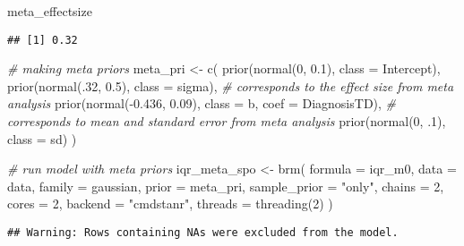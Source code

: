 \documentclass[
]{article}
\newenvironment{Shaded}{\begin{snugshade}}{\end{snugshade}}
\newcommand{\AttributeTok}[1]{\textcolor[rgb]{0.77,0.63,0.00}{#1}}
\newcommand{\CommentTok}[1]{\textcolor[rgb]{0.56,0.35,0.01}{\textit{#1}}}
\newcommand{\DecValTok}[1]{\textcolor[rgb]{0.00,0.00,0.81}{#1}}
\newcommand{\FloatTok}[1]{\textcolor[rgb]{0.00,0.00,0.81}{#1}}
\newcommand{\FunctionTok}[1]{\textcolor[rgb]{0.00,0.00,0.00}{#1}}
\newcommand{\NormalTok}[1]{#1}
\newcommand{\OtherTok}[1]{\textcolor[rgb]{0.56,0.35,0.01}{#1}}
\newcommand{\SpecialCharTok}[1]{\textcolor[rgb]{0.00,0.00,0.00}{#1}}
\newcommand{\StringTok}[1]{\textcolor[rgb]{0.31,0.60,0.02}{#1}}
\begin{document}
\begin{Shaded}
\begin{Highlighting}[]
\NormalTok{meta\_effectsize}
\end{Highlighting}
\end{Shaded}

\begin{verbatim}
## [1] 0.32
\end{verbatim}

\begin{Shaded}
\begin{Highlighting}[]
\CommentTok{\# making meta priors}
\NormalTok{meta\_pri }\OtherTok{\textless{}{-}} \FunctionTok{c}\NormalTok{(}
  \FunctionTok{prior}\NormalTok{(}\FunctionTok{normal}\NormalTok{(}\DecValTok{0}\NormalTok{, }\FloatTok{0.1}\NormalTok{), }\AttributeTok{class =}\NormalTok{ Intercept),}
  \FunctionTok{prior}\NormalTok{(}\FunctionTok{normal}\NormalTok{(.}\DecValTok{32}\NormalTok{, }\FloatTok{0.5}\NormalTok{), }\AttributeTok{class =}\NormalTok{ sigma), }\CommentTok{\# corresponds to the effect size from meta analysis}
  \FunctionTok{prior}\NormalTok{(}\FunctionTok{normal}\NormalTok{(}\SpecialCharTok{{-}}\FloatTok{0.436}\NormalTok{, }\FloatTok{0.09}\NormalTok{), }\AttributeTok{class =}\NormalTok{ b, }\AttributeTok{coef =}\NormalTok{ DiagnosisTD), }\CommentTok{\# corresponds to mean and standard error from meta analysis}
  \FunctionTok{prior}\NormalTok{(}\FunctionTok{normal}\NormalTok{(}\DecValTok{0}\NormalTok{, .}\DecValTok{1}\NormalTok{), }\AttributeTok{class =}\NormalTok{ sd)}
\NormalTok{)}

\CommentTok{\# run model with meta priors}
\NormalTok{iqr\_meta\_spo }\OtherTok{\textless{}{-}} \FunctionTok{brm}\NormalTok{(}
  \AttributeTok{formula =}\NormalTok{ iqr\_m0,}
  \AttributeTok{data =}\NormalTok{ data,}
  \AttributeTok{family =}\NormalTok{ gaussian,}
  \AttributeTok{prior =}\NormalTok{ meta\_pri,}
  \AttributeTok{sample\_prior =} \StringTok{"only"}\NormalTok{,}
  \AttributeTok{chains =} \DecValTok{2}\NormalTok{,}
  \AttributeTok{cores =} \DecValTok{2}\NormalTok{,}
  \AttributeTok{backend =} \StringTok{"cmdstanr"}\NormalTok{,}
  \AttributeTok{threads =} \FunctionTok{threading}\NormalTok{(}\DecValTok{2}\NormalTok{)}
\NormalTok{)}
\end{Highlighting}
\end{Shaded}

\begin{verbatim}
## Warning: Rows containing NAs were excluded from the model.
\end{verbatim}
\end{document}
